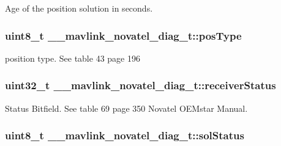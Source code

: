 Age of the position solution in seconds. 

\hypertarget{struct____mavlink__novatel__diag__t_aeba2cb0f37324ed79543b2f02ee6e962}{
\subsubsection[{pos\+Type}]{\setlength{\rightskip}{0pt plus 5cm}uint8\+\_\+t \+\_\+\+\_\+mavlink\+\_\+novatel\+\_\+diag\+\_\+t\+::pos\+Type}}\label{struct____mavlink__novatel__diag__t_aeba2cb0f37324ed79543b2f02ee6e962}


position type. See table 43 page 196 

\hypertarget{struct____mavlink__novatel__diag__t_a256afd71d704c3f117f84734cc2f14fc}{
\subsubsection[{receiver\+Status}]{\setlength{\rightskip}{0pt plus 5cm}uint32\+\_\+t \+\_\+\+\_\+mavlink\+\_\+novatel\+\_\+diag\+\_\+t\+::receiver\+Status}}\label{struct____mavlink__novatel__diag__t_a256afd71d704c3f117f84734cc2f14fc}


Status Bitfield. See table 69 page 350 Novatel O\+E\+Mstar Manual. 

\hypertarget{struct____mavlink__novatel__diag__t_aff2e374787173642c086d502b9177b02}{
\subsubsection[{sol\+Status}]{\setlength{\rightskip}{0pt plus 5cm}uint8\+\_\+t \+\_\+\+\_\+mavlink\+\_\+novatel\+\_\+diag\+\_\+t\+::sol\+Status}}\label{struct____mavlink__novatel__diag__t_aff2e374787173642c086d502b9177b02}


